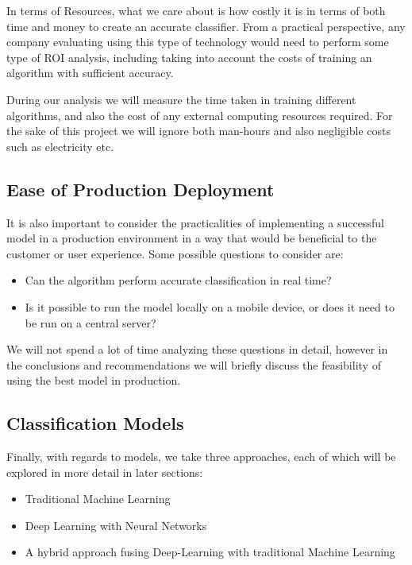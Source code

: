 \documentclass[10pt,a4paper]{article}
\begin{document}
In terms of Resources, what we care about is how costly it is in terms of both time and money to create an accurate classifier. From a practical perspective, any company evaluating using this type of technology would need to perform some type of ROI analysis, including taking into account the costs of training an algorithm with sufficient accuracy.

During our analysis we will measure the time taken in training different algorithms, and also the cost of any external computing resources required. For the sake of this project we will ignore both man-hours and also negligible costs such as electricity etc.

\subsection*{Ease of Production Deployment}

It is also important to consider the practicalities of implementing a successful model in a production environment in a way that would be beneficial to the customer or user experience. Some possible questions to consider are:

\begin{itemize}
\item Can the algorithm perform accurate classification in real time?
\item Is it possible to run the model locally on a mobile device, or does it need to be run on a central server?
\end{itemize}

We will not spend a lot of time analyzing these questions in detail, however in the conclusions and recommendations we will briefly discuss the feasibility of using the best model in production.

\subsection*{Classification Models}

Finally, with regards to models, we take three approaches, each of which will be explored in more detail in later sections:

\begin{itemize}
\item Traditional Machine Learning
\item Deep Learning with Neural Networks
\item A hybrid approach fusing Deep-Learning with traditional Machine Learning
\end{itemize}
\end{document}
